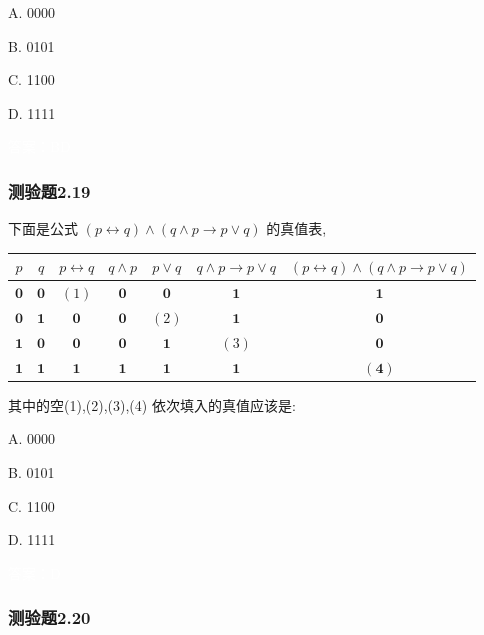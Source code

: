 \documentclass[UTF8, heading=true]{ctexart}
\begin{document}
A. 0000

B. 0101

C. 1100

D. 1111

\textcolor{white}{答案：BD}

\subsubsection{测验题2.19}

下面是公式 $(p \leftrightarrow q) \wedge(q \wedge p \rightarrow p \vee q)$ 的真值表,


\begin{table}[H]
\centering
\begin{tabular}{c|c|c|c|c|c|c}
\hline$p$ & $q$ & $p \leftrightarrow q$ & $q \wedge p$ & $p \vee q$ & $q \wedge p \rightarrow p \vee q$ & $(p \leftrightarrow q) \wedge(q \wedge p \rightarrow p \vee q)$ \\
\hline $\mathbf{0}$ & $\mathbf{0}$ & $(1)$ & $\mathbf{0}$ & $\mathbf{0}$ & $\mathbf{1}$ & $\mathbf{1}$ \\
\hline $\mathbf{0}$ & $\mathbf{1}$ & $\mathbf{0}$ & $\mathbf{0}$ & $(2)$ & $\mathbf{1}$ & $\mathbf{0}$ \\
\hline $\mathbf{1}$ & $\mathbf{0}$ & $\mathbf{0}$ & $\mathbf{0}$ & $\mathbf{1}$ & $(3)$ & $\mathbf{0}$ \\
\hline $\mathbf{1}$ & $\mathbf{1}$ & $\mathbf{1}$ & $\mathbf{1}$ & $\mathbf{1}$ & $\mathbf{1}$ & $\mathbf{( 4 )}$ \\
\hline
\end{tabular}
\end{table}

其中的空(1),(2),(3),(4) 依次填入的真值应该是:

A. 0000

B. 0101

C. 1100

D. 1111

\textcolor{white}{答案：D}

\subsubsection{测验题2.20}
\end{document}
